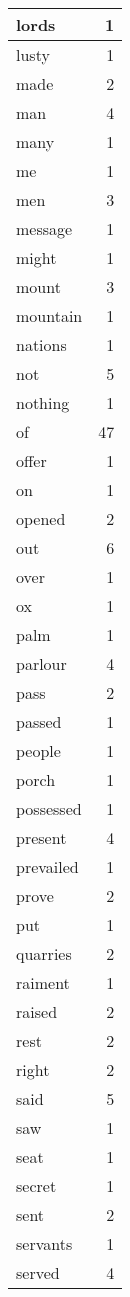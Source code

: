 \begin{center}
\begin{longtable}{l|r}
lords & 1 \\ \hline
lusty & 1 \\ \hline
made & 2 \\ \hline
man & 4 \\ \hline
many & 1 \\ \hline
me & 1 \\ \hline
men & 3 \\ \hline
message & 1 \\ \hline
might & 1 \\ \hline
mount & 3 \\ \hline
mountain & 1 \\ \hline
nations & 1 \\ \hline
not & 5 \\ \hline
nothing & 1 \\ \hline
of & 47 \\ \hline
offer & 1 \\ \hline
on & 1 \\ \hline
opened & 2 \\ \hline
out & 6 \\ \hline
over & 1 \\ \hline
ox & 1 \\ \hline
palm & 1 \\ \hline
parlour & 4 \\ \hline
pass & 2 \\ \hline
passed & 1 \\ \hline
people & 1 \\ \hline
porch & 1 \\ \hline
possessed & 1 \\ \hline
present & 4 \\ \hline
prevailed & 1 \\ \hline
prove & 2 \\ \hline
put & 1 \\ \hline
quarries & 2 \\ \hline
raiment & 1 \\ \hline
raised & 2 \\ \hline
rest & 2 \\ \hline
right & 2 \\ \hline
said & 5 \\ \hline
saw & 1 \\ \hline
seat & 1 \\ \hline
secret & 1 \\ \hline
sent & 2 \\ \hline
servants & 1 \\ \hline
served & 4 \\ \hline

\end{longtable}
\end{center}
